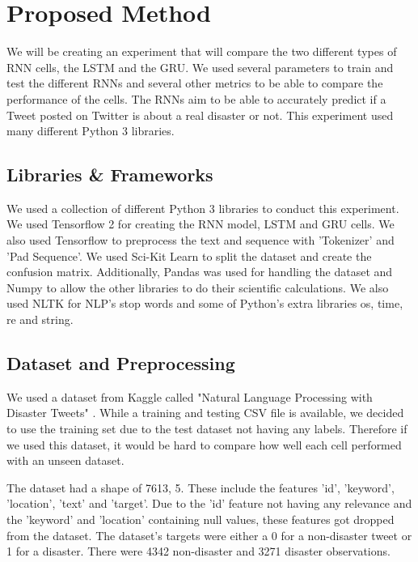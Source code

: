 \documentclass[a4paper,10pt]{article}
\begin{document}
\section{Proposed Method}
	We will be creating an experiment that will compare the two different types of RNN cells, the LSTM and the GRU. We used several parameters to train and test the different RNNs and several other metrics to be able to compare the performance of the cells. The RNNs aim to be able to accurately predict if a Tweet posted on Twitter is about a real disaster or not. This experiment used many different Python 3 libraries.

\subsection{Libraries \& Frameworks}
	We used a collection of different Python 3 libraries to conduct this experiment. We used Tensorflow 2 \cite{tensorflow} for creating the RNN model, LSTM and GRU cells. We also used Tensorflow to preprocess the text and sequence with 'Tokenizer' and 'Pad Sequence'. We used Sci-Kit Learn \cite{scikit-learn} to split the dataset and create the confusion matrix. Additionally, Pandas \cite{mckinney-proc-scipy-2010} was used for handling the dataset and Numpy to allow the other libraries to do their scientific calculations. We also used NLTK \cite{Loper02nltk:the} for NLP's stop words and some of Python's extra libraries os, time, re and string. 

\subsection{Dataset and Preprocessing}
	We used a dataset from Kaggle called "Natural Language Processing with Disaster Tweets" \cite{disater_kaggle}. While a training and testing CSV file is available, we decided to use the training set due to the test dataset not having any labels. Therefore if we used this dataset, it would be hard to compare how well each cell performed with an unseen dataset.
	
	The dataset had a shape of 7613, 5. These include the features 'id', 'keyword', 'location', 'text' and 'target'. Due to the 'id' feature not having any relevance and the 'keyword' and 'location' containing null values, these features got dropped from the dataset. The dataset's targets were either a 0 for a non-disaster tweet or 1 for a disaster. There were 4342 non-disaster and 3271 disaster observations.
	
\end{document}
